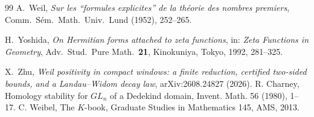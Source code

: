 \documentclass[11pt]{amsart}
\theoremstyle{definition}
\theoremstyle{remark}
\begin{document}
\begin{thebibliography}{99}
 A.~Weil, \emph{Sur les ``formules explicites'' de la th\'eorie des nombres
premiers}, Comm.~S\'em.~Math.~Univ.~Lund (1952), 252--265.

 H.~Yoshida, \emph{On Hermitian forms attached to zeta functions}, in:
\emph{Zeta Functions in Geometry}, Adv.~Stud.~Pure Math.~\textbf{21}, Kinokuniya, Tokyo, 1992, 281--325.

 X.~Zhu, \emph{Weil positivity in compact windows: a finite reduction, certified
two-sided bounds, and a Landau--Widom decay law}, arXiv:2608.24827 (2026).
 R. Charney, Homology stability for $GL_n$ of a Dedekind domain, Invent. Math. 56 (1980), 1--17.
 C. Weibel, The $K$-book, Graduate Studies in Mathematics 145, AMS, 2013.
\end{thebibliography}
\end{document}
